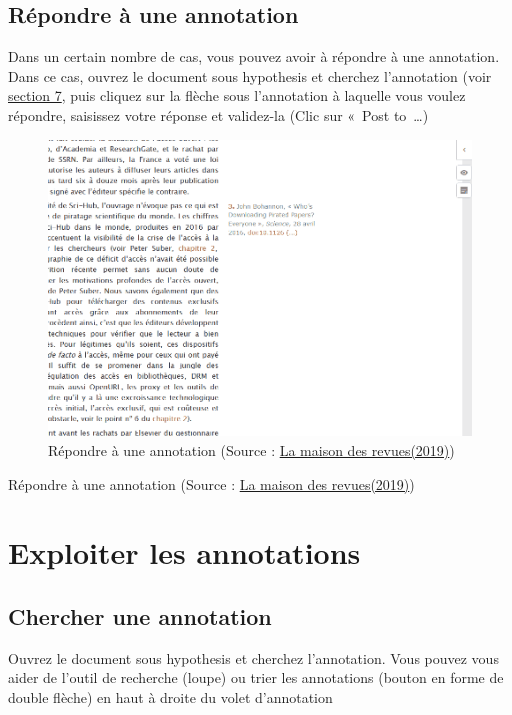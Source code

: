 \documentclass[
]{book}
\begin{document}
\hypertarget{s65}{%
\section{Répondre à une annotation}\label{s65}}

Dans un certain nombre de cas, vous pouvez avoir à répondre à une annotation. Dans ce cas, ouvrez le document sous hypothesis et cherchez l'annotation (voir \protect\hyperlink{s7}{section 7}, puis cliquez sur la flèche sous l'annotation à laquelle vous voulez répondre, saisissez votre réponse et validez-la (Clic sur «~Post to~\ldots)

\begin{figure}
\centering
\includegraphics{img/30f5eff1df71626cf0748cd0af596424.png}
\caption{Répondre à une annotation (Source : \href{http://www.maisondesrevues.org/1182}{La maison des revues(2019)})}
\end{figure}

Répondre à une annotation (Source : \href{http://www.maisondesrevues.org/1182}{La maison des revues(2019)})

\hypertarget{s7}{%
\chapter{Exploiter les annotations}\label{s7}}

\hypertarget{s71}{%
\section{Chercher une annotation}\label{s71}}

Ouvrez le document sous hypothesis et cherchez l'annotation. Vous pouvez vous aider de l'outil de recherche (loupe) ou trier les annotations (bouton en forme de double flèche) en haut à droite du volet d'annotation
\end{document}
